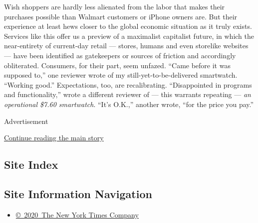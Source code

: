 Wish shoppers are hardly less alienated from the labor that makes their
purchases possible than Walmart customers or iPhone owners are. But
their experience at least hews closer to the global economic situation
as it truly exists. Services like this offer us a preview of a
maximalist capitalist future, in which the near-entirety of current-day
retail --- stores, humans and even storelike websites --- have been
identified as gatekeepers or sources of friction and accordingly
obliterated. Consumers, for their part, seem unfazed. ``Came before it
was supposed to,'' one reviewer wrote of my still-yet-to-be-delivered
smartwatch. ``Working good.'' Expectations, too, are recalibrating.
``Disappointed in programs and functionality,'' wrote a different
reviewer of --- this warrants repeating --- \emph{an operational \$7.60
smartwatch}. ``It's O.K.,'' another wrote, ``for the price you pay.''

Advertisement

\protect\hyperlink{after-bottom}{Continue reading the main story}

\hypertarget{site-index}{%
\subsection{Site Index}\label{site-index}}

\hypertarget{site-information-navigation}{%
\subsection{Site Information
Navigation}\label{site-information-navigation}}

\begin{itemize}
\tightlist
\item
  \href{https://help.nytimes3xbfgragh.onion/hc/en-us/articles/115014792127-Copyright-notice}{©~2020~The
  New York Times Company}
\end{itemize}

